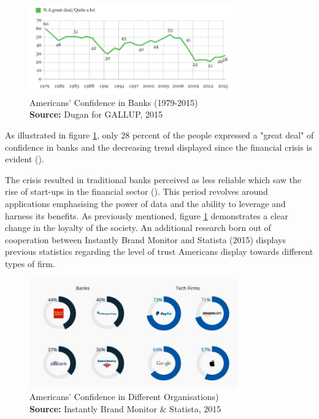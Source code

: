 \documentclass[12pt,a4paper]{article}
\newcommand*{\captionsource}[2]{%
  \caption[{#1}]{%
    #1%
    \\\hspace{\linewidth}%
    \textbf{Source:} #2%
  }%
}
\begin{document}

\newpage
  \vspace{5mm}
\begin{figure}[H]
	\centering
  \includegraphics[width=90mm]{figures/fig1_america_survey_trust_banks}
  \vspace{5mm}
    \captionsetup{justification=centering,margin=2cm}
      \captionsource{Americans' Confidence in Banks (1979-2015)}{Dugan for GALLUP, 2015}
	\label{fig:bank_trust_survey}
\end{figure}

As illustrated in figure \ref{fig:bank_trust_survey}, only 28 percent of the people expressed a "great deal" of confidence in banks and the decreasing trend displayed since the financial crisis is evident (\cite{andrewConfidenceBanksLow2015}). \par  
The crisis resulted in traditional banks perceived as less reliable which saw the rise of start-ups in the financial sector (\cite{arner150YearsFintech2016}). This period revolves around applications emphasising the power of data and the ability to leverage and harness its benefits. As previously mentioned, figure \ref{fig:bank_trust_survey}  demonstrates a clear change in the loyalty of the society. An additional research born out of cooperation between Instantly Brand Monitor and Statista (2015) displays previous statistics regarding the level of trust Americans display towards different types of firm. 

  \vspace{5mm}
\begin{figure}[H]
	\centering
  \includegraphics[width=0.8\textwidth, scale=0.1]{figures/fig2_breakdown_american_survey}
  \vspace{5mm}
    \captionsetup{justification=centering,margin=2cm}
      \captionsource{Americans' Confidence in Different Organisations)}{Instantly Brand Monitor \& Statista, 2015}
	\label{fig:org_trust_breakdown}
\end{figure}
\end{document}
